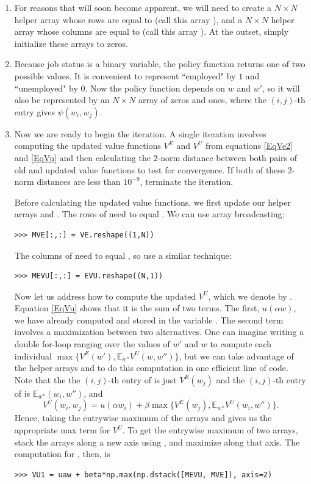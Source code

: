 \begin{problem}
\begin{enumerate}
   \item For reasons that will soon become apparent, we will need to create a $N\times N$ helper array
   whose rows are equal to  (call this array ), and a $N \times N$ helper array whose columns 
   are equal to  (call this array ).
   At the outset, simply initialize these arrays to zeros.
   
   \item Because job status is a binary variable, the policy function returns one of two possible values. It is
   convenient to represent ``employed" by $1$ and ``unemployed" by $0$. Now the policy function depends
   on $w$ and $w'$, so it will also be represented by an $N\times N$ array  of zeros and ones, 
   where the $(i,j)$-th entry gives $\psi(w_i, w_j)$.
   
   \item Now we are ready to begin the iteration.
   A single iteration involves computing the updated value functions $V^E$ and $V^U$ from
   equations \eqref{EqVe2} and \eqref{EqVu} and then calculating the $2$-norm distance between
   both pairs of old and updated value functions to test for convergence. If both of these 
   $2$-norm distances are less than $10^{-9}$, terminate the iteration.
   
   Before calculating the updated value functions, we first update our helper arrays  and
   . The rows of  need to equal . We can use array broadcasting:
\begin{lstlisting}
>>> MVE[:,:] = VE.reshape((1,N))
\end{lstlisting}
   The columns of  need to equal , so use a similar technique:
\begin{lstlisting}
>>> MEVU[:,:] = EVU.reshape((N,1))
\end{lstlisting}

   Now let us address how to compute the updated $V^U$, which we denote by . 
   Equation \eqref{EqVu} shows that it is the sum of 
   two terms. The first, $u(\alpha w)$, we have already computed and stored in the variable .
   The second term involves a maximization between two alternatives. One can imagine writing
   a double for-loop ranging over the values of $w'$ and $w$ to compute each individual 
   $\max\{V^E(w'), \mathbb{E}_{w''}V^U(w,w'')\}$, but we can take advantage of the helper
   arrays  and  to do this computation in one efficient line of code.
   Note that the the $(i,j)$-th entry of  is just $V^E(w_j)$ and the $(i,j)$-th
   entry of  is $\mathbb{E}_{w''}(w_i, w'')$, and
   \[
   V^U(w_i,w_j) = u(\alpha w_i) + \beta\max\{V^E(w_j), \mathbb{E}_{w''}V^U(w_i,w'')\}.
   \]
   Hence, taking the entrywise maximum of the arrays  and  gives us the appropriate
   max term for $V^U$. To get the entrywise maximum of two arrays, stack the arrays along a new
   axis using , and maximize along that axis. The computation for , then, is
   \begin{lstlisting}
>>> VU1 = uaw + beta*np.max(np.dstack([MEVU, MVE]), axis=2)
   \end{lstlisting}
   

\end{enumerate}
\end{problem}
